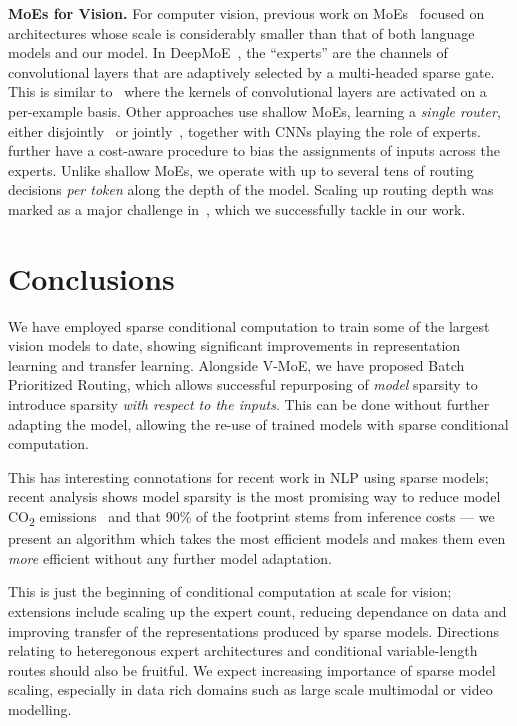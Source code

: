 \documentclass{article}
\newcommand{\abbv}{{V-MoE}}
\newcommand{\maxrouting}{Batch Prioritized Routing}
\begin{document}
\textbf{MoEs for Vision.} For computer vision, previous work on MoEs~\cite{eigen2013learning, ahmed2016network, gross2017hard, abbas2020biased, wang2020deep, pavlitskaya2020using, yang2019condconv} focused on architectures whose scale is considerably smaller than that of both language models and our model. In DeepMoE~\cite{wang2020deep}, the ``experts'' are the channels of convolutional layers that are adaptively selected by a multi-headed sparse gate. This is similar to~\cite{yang2019condconv} where the kernels of convolutional layers are activated on a per-example basis.
Other approaches use shallow MoEs, learning a \textit{single router}, either disjointly~\cite{gross2017hard} or jointly~\cite{ahmed2016network}, together with CNNs playing the role of experts. \cite{abbas2020biased} further have a cost-aware procedure to bias the assignments of inputs across the experts. 
Unlike shallow MoEs, we operate with up to several tens of routing decisions \emph{per token} along the depth of the model. Scaling up routing depth was marked as a major challenge in~\cite{ramachandran2018diversity}, which we successfully tackle in our work.

 \section{Conclusions}
\label{sec:conclusions}
We have employed sparse conditional computation to train some of the largest vision models to date, showing significant improvements in representation learning and transfer learning.
Alongside \abbv{}, we have proposed \maxrouting{}, which allows successful repurposing of \textit{model} sparsity to introduce sparsity \textit{with respect to the inputs}. This can be done without further adapting the model, allowing the re-use of trained models with sparse conditional computation.

This has interesting connotations for recent work in NLP using sparse models; recent analysis shows model sparsity is the most promising way to reduce model CO\textsubscript{2} emissions~\cite{patterson2021carbon} and that 90\% of the footprint stems from inference costs --- we present an algorithm which takes the most efficient models and makes them even \textit{more} efficient without any further model adaptation.

This is just the beginning of conditional computation at scale for vision; extensions include
scaling up the expert count, reducing dependance on data and improving transfer of the representations produced by sparse models. Directions relating to heteregonous expert architectures and conditional variable-length routes should also be fruitful. We expect increasing importance of sparse model scaling, especially in data rich domains such as large scale multimodal or video modelling.
\end{document}
